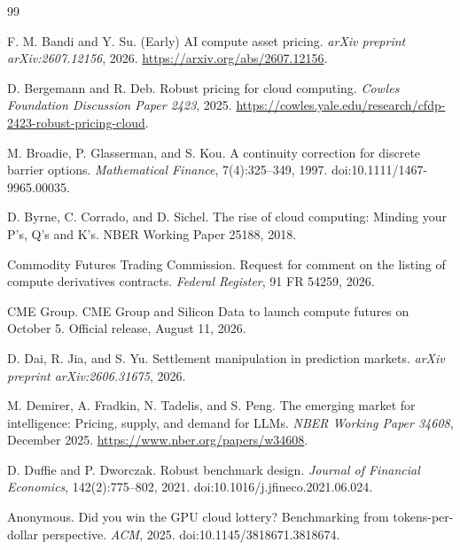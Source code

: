 \documentclass[10pt,twocolumn]{article}
\begin{document}
\small
\begin{thebibliography}{99}

F. M. Bandi and Y. Su.
\newblock (Early) AI compute asset pricing.
\newblock \emph{arXiv preprint arXiv:2607.12156}, 2026.
\newblock \url{https://arxiv.org/abs/2607.12156}.

D. Bergemann and R. Deb.
\newblock Robust pricing for cloud computing.
\newblock \emph{Cowles Foundation Discussion Paper 2423}, 2025.
\newblock \url{https://cowles.yale.edu/research/cfdp-2423-robust-pricing-cloud}.

M. Broadie, P. Glasserman, and S. Kou.
\newblock A continuity correction for discrete barrier options.
\newblock \emph{Mathematical Finance}, 7(4):325--349, 1997.
\newblock doi:10.1111/1467-9965.00035.

D. Byrne, C. Corrado, and D. Sichel.
\newblock The rise of cloud computing: Minding your P's, Q's and K's.
\newblock NBER Working Paper 25188, 2018.

Commodity Futures Trading Commission.
\newblock Request for comment on the listing of compute derivatives contracts.
\newblock \emph{Federal Register}, 91 FR 54259, 2026.

CME Group.
\newblock CME Group and Silicon Data to launch compute futures on October 5.
\newblock Official release, August 11, 2026.

D. Dai, R. Jia, and S. Yu.
\newblock Settlement manipulation in prediction markets.
\newblock \emph{arXiv preprint arXiv:2606.31675}, 2026.

M. Demirer, A. Fradkin, N. Tadelis, and S. Peng.
\newblock The emerging market for intelligence: Pricing, supply, and demand for LLMs.
\newblock \emph{NBER Working Paper 34608}, December 2025.
\newblock \url{https://www.nber.org/papers/w34608}.

D. Duffie and P. Dworczak.
\newblock Robust benchmark design.
\newblock \emph{Journal of Financial Economics}, 142(2):775--802, 2021.
\newblock doi:10.1016/j.jfineco.2021.06.024.

Anonymous.
\newblock Did you win the GPU cloud lottery? Benchmarking from tokens-per-dollar perspective.
\newblock \emph{ACM}, 2025.
\newblock doi:10.1145/3818671.3818674.


\end{thebibliography}
\end{document}
